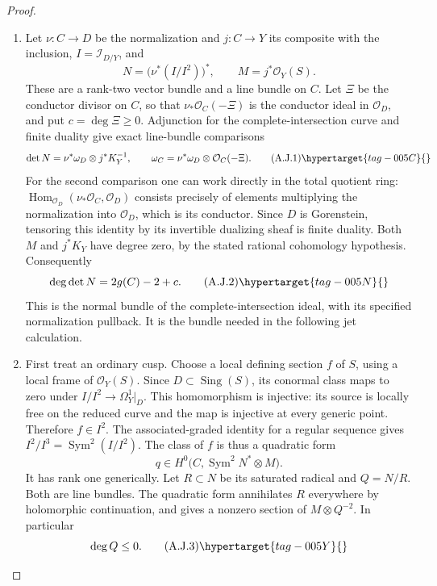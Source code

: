 \begin{proof}

\begin{enumerate}[label={$\langle1\rangle$\arabic*.},leftmargin=*]
\item Let $\nu:C\to D$ be the normalization and $j:C\to Y$
its composite with the inclusion,
$I=\mathcal I_{D/Y}$, and
\[
 N=\bigl(\nu^*(I/I^2)\bigr)^*,\qquad
 M=j^*\mathcal O_Y(S).
\]
These are a rank-two vector bundle and a line bundle on $C$.
Let $\Xi$ be the conductor divisor on $C$, so that
$\nu_*\mathcal O_C(-\Xi)$ is the conductor ideal in
$\mathcal O_D$, and put $c=\deg\Xi\geq0$.
Adjunction for the complete-intersection curve and finite
duality give exact line-bundle comparisons
\[
 \det N=\nu^*\omega_D\otimes j^*K_Y^{-1},\qquad
 \omega_C=\nu^*\omega_D\otimes\mathcal O_C(-\Xi).
                                                        \tag{A.J.1}\hypertarget{tag-005C}{}\label{cdp:eq:A.J.1}
\]
For the second comparison one can work directly in the total
quotient ring: $\operatorname{Hom}_{\mathcal O_D}
(\nu_*\mathcal O_C,\mathcal O_D)$ consists precisely of
elements multiplying the normalization into $\mathcal O_D$,
which is its conductor. Since $D$ is Gorenstein, tensoring
this identity by its invertible dualizing sheaf is finite
duality. Both $M$ and $j^*K_Y$ have degree zero, by the
stated rational cohomology hypothesis. Consequently
\[
 \deg\det N=2g(C)-2+c.                              \tag{A.J.2}\hypertarget{tag-005N}{}\label{cdp:eq:A.J.2}
\]
This is the normal bundle of the complete-intersection ideal,
with its specified normalization pullback. It is the bundle
needed in the following jet calculation.

\item First treat an ordinary cusp. Choose a local defining section
$f$ of $S$, using a local frame of $\mathcal O_Y(S)$.
Since $D\subset\operatorname{Sing}(S)$, its conormal class
maps to zero under
$I/I^2\to\Omega_Y^1|_D$. This homomorphism is injective:
its source is locally free on the reduced curve and the map
is injective at every generic point. Therefore $f\in I^2$.
The associated-graded identity for a regular sequence gives
$I^2/I^3=\operatorname{Sym}^2(I/I^2)$. The class of $f$
is thus a quadratic form
\[
 q\in H^0\bigl(C,\operatorname{Sym}^2N^*\otimes M\bigr).
\]
It has rank one generically. Let $R\subset N$ be its
saturated radical and $Q=N/R$. Both are line bundles.
The quadratic form annihilates $R$ everywhere by holomorphic
continuation, and gives a nonzero section of $M\otimes Q^{-2}$.
In particular
\[
 \deg Q\leq0.                                      \tag{A.J.3}\hypertarget{tag-005Y}{}\label{cdp:eq:A.J.3}
\]


\end{enumerate}
\end{proof}
